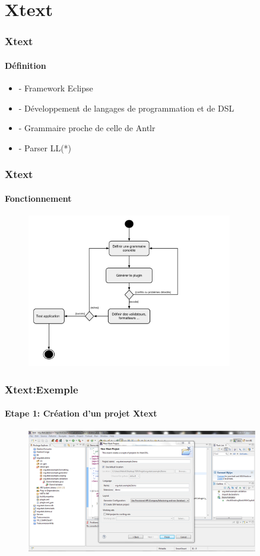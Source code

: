 \documentclass{beamer}
\begin{document}
\section{Xtext}
	
	 
	
	 
	\begin{frame}
	\frametitle{Xtext}\framesubtitle{Définition}
 \begin{itemize}
			\item - Framework Eclipse
			\item - Développement de langages de programmation et de DSL
			\item - Grammaire proche de celle de Antlr
			\item - Parser LL(*) 
\end{itemize}
\end{frame} 





	\begin{frame}
	\frametitle{Xtext}\framesubtitle{Fonctionnement}
	\begin{figure}[h]
	\centering
		\includegraphics[width=0.80\textwidth]{DiagrammeXtext.png}
	\label{fig:DiagrammeFluxXtext}
\end{figure}

\end{frame} 



	\begin{frame}
	\frametitle{Xtext:Exemple}\framesubtitle{Etape 1: Création d'un projet Xtext}
	\begin{figure}[h]
	\centering
			\includegraphics[width=0.90\textwidth]{1.PNG}
	\label{fig:1}
\end{figure}

\end{frame} 
\end{document}
